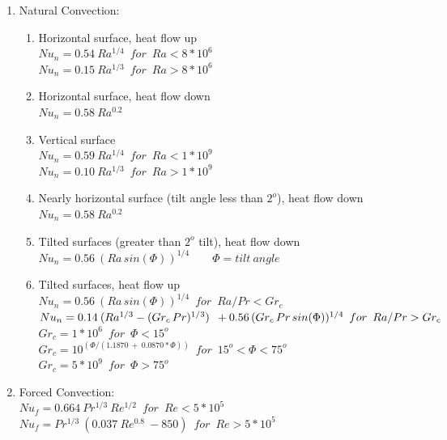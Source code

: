 \begin{enumerate}
   \item Natural Convection:
   \begin{enumerate}
     \item Horizontal surface, heat flow up \\
     $Nu_n = 0.54 \: Ra^{1/4} \enspace for \enspace Ra < 8 * 10^6$ \\
     $Nu_n = 0.15 \: Ra^{1/3} \enspace for \enspace Ra > 8 * 10^6$
     \item Horizontal surface, heat flow down \\
     $Nu_n = 0.58 \: Ra^{0.2}$
     \item Vertical surface \\
     $Nu_n = 0.59 \: Ra^{1/4} \enspace for \enspace Ra < 1 * 10^9$ \\
     $Nu_n = 0.10 \: Ra^{1/3} \enspace for \enspace Ra > 1 * 10^9$
     \item Nearly horizontal surface (tilt angle less than $2^o$), heat flow down \\
     $Nu_n = 0.58 \: Ra^{0.2}$
     \item Tilted surfaces (greater than $2^o$ tilt), heat flow down \\
     $Nu_n = 0.56 \: (Ra \, sin (\Phi))^{1/4} \qquad  \Phi = tilt \: angle$
     \item Tilted surfaces, heat flow up \\
     $Nu_n = 0.56 \: (Ra \, sin (\Phi))^{1/4} \enspace for \enspace Ra/Pr < Gr_c$ \\
     $Nu_n = 0.14 \: (Ra^{1/3}- (Gr_c\,Pr)^{1/3}) \\
     \enspace + 0.56\,(Gr_c \, Pr \, sin (\Phi))^{1/4} \enspace for \enspace Ra/Pr > Gr_c$ \\
     $Gr_c = 1 * 10^6 \enspace for \enspace \Phi < 15^o $ \\
     $Gr_c = 10^{(\Phi / (1.1870\:+\:0.0870*\Phi))} \enspace for \enspace 15^o < \Phi < 75^o $ \\
     $Gr_c = 5 * 10^9 \enspace for \enspace \Phi > 75^o $
   \end{enumerate}
   \item Forced Convection: \\
   $Nu_f = 0.664 \: Pr^{1/3} \: Re^{1/2} \enspace for \enspace Re < 5 * 10^5$ \\
   $Nu_f = Pr^{1/3} \: (0.037 \: Re^{0.8} \: - 850) \enspace for \enspace Re > 5 * 10^5$
\end{enumerate}

